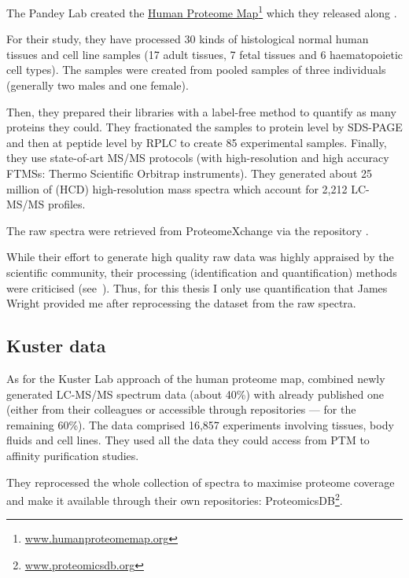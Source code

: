 The Pandey Lab \citep{PandeyData} created the \href{http://www.humanproteomemap.org/}%
{Human Proteome Map}\footnote{%
\href{http://www.humanproteomemap.org/}{www.humanproteomemap.org}} which
they released along .

For their study, they have processed 30 kinds of histological normal human
tissues and cell line samples (17 adult tissues, 7 fetal tissues and 6
haematopoietic cell types). The samples were created from pooled samples of three
individuals (generally two males and one female).

Then, they prepared their libraries with a label-free method to quantify
as many proteins they could. They fractionated the samples to protein level by
\gls{SDS-PAGE} and then at peptide level by \gls{RPLC} to create 85 experimental
samples. Finally, they use state-of-art \gls{MS/MS} protocols
(with high-resolution and high accuracy \glspl{FTMS}:
Thermo Scientific Orbitrap instruments).
They generated about 25 million of (\gls{HCD})
high-resolution mass spectra which account for 2,212 \gls{LC-MS/MS} profiles.

The raw spectra were retrieved from ProteomeXchange via the repository
.

While their effort to generate high quality raw data was highly appraised
by the scientific community, their processing
(identification and quantification) methods were
criticised (see~\cite{Ezkurdia2014-qx}). Thus, for this thesis I only use
quantification that James Wright provided me after reprocessing the dataset
from the raw spectra.

\subsection{Kuster data}

As for the Kuster Lab approach of the human proteome map,
\cite{KusterData} combined newly generated \gls{LC-MS/MS} spectrum
data (about 40\%) with already published one
(either from their colleagues or accessible through repositories ---
for the remaining 60\%).
The data comprised 16,857 experiments involving tissues, body fluids and cell
lines. They used all the data they could access from \gls{PTM} to affinity
purification studies.

They reprocessed the whole collection of spectra to maximise proteome coverage
and make it available through their own repositories: ProteomicsDB\footnote{%
\href{https://www.proteomicsdb.org/}{www.proteomicsdb.org}}.

